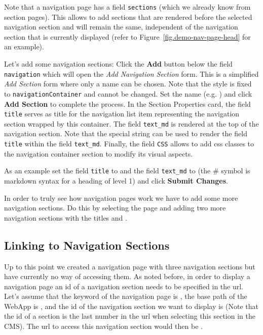 \documentclass[a4paper,oneside]{book}
\begin{document}
Note that a navigation page has a field \texttt{sections} (which we already know from section pages).
This allows to add sections that are rendered before the selected navigation section and will remain the same, independent of the navigation section that is currently displayed (refer to Figure~\ref{fig.demo-nav-page-head} for an example).

Let's add some navigation sections:
Click the \textbf{Add} button below the field \texttt{navigation} which will open the \emph{Add Navigation Section} form.
This is a simplified \emph{Add Section} form where only a name can be chosen.
Note that the style is fixed to \texttt{navigationContainer} and cannot be changed.
Set the name (e.g. ) and click \textbf{Add Section} to complete the process.
In the Section Properties card, the field \texttt{title} serves as title for the navigation list item representing the navigation section wrapped by this container.
The field \texttt{text\_md} is rendered at the top of the navigation section.
Note that the special string  can be used to render the field \texttt{title} within the field \texttt{text\_md}.
Finally, the field \texttt{CSS} allows to add css classes to the navigation container section to modify its visual aspects.

As an example set the field \texttt{title} to  and the field \texttt{text\_md} to  (the \# symbol is markdown syntax for a heading of level 1) and click \textbf{Submit Changes}.

In order to truly see how navigation pages work we have to add some more navigation sections.
Do this by selecting the page  and adding two more navigation sections with the titles  and .

\subsection{Linking to Navigation Sections}
Up to this point we created a navigation page with three navigation sections but have currently no way of accessing them.
As noted before, in order to display a navigation page an id of a navigation section needs to be specified in the url.
Let's assume that the keyword of the navigation page is , the base path of the WebApp is , and the id of the navigation section we want to display is  (Note that the id of a section is the last number in the url when selecting this section in the CMS).
The url to access this navigation section would then be .
\end{document}
